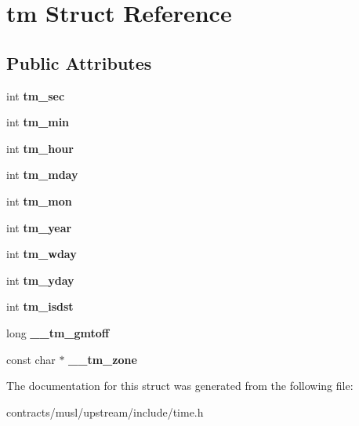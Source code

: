 \hypertarget{structtm}{}\section{tm Struct Reference}
\label{structtm}
\subsection*{Public Attributes}
\begin{DoxyCompactItemize}
\item 
\mbox{\label{structtm_a4d098a9a5c03a00b2ee61e10851de81e}} 
int {\bfseries tm\+\_\+sec}
\item 
\mbox{\label{structtm_af414eb7c86cc3099595211eee4d4211b}} 
int {\bfseries tm\+\_\+min}
\item 
\mbox{\label{structtm_a3e7ca4e37f1abcaf56b8a916c38eb9fe}} 
int {\bfseries tm\+\_\+hour}
\item 
\mbox{\label{structtm_ab8d8904bad43b0c8b96e61941c5b5310}} 
int {\bfseries tm\+\_\+mday}
\item 
\mbox{\label{structtm_a112ac36fa2f593777138a417cf031e17}} 
int {\bfseries tm\+\_\+mon}
\item 
\mbox{\label{structtm_a33adf78fd6476b2120ce3b9c4a852053}} 
int {\bfseries tm\+\_\+year}
\item 
\mbox{\label{structtm_afe81a8c46f1c693c43f259b288859f4f}} 
int {\bfseries tm\+\_\+wday}
\item 
\mbox{\label{structtm_a93a0ba77cc23796df84405dcbcc57eb1}} 
int {\bfseries tm\+\_\+yday}
\item 
\mbox{\label{structtm_a5645ca0580c8ab2c24f6c2965d9c9f9c}} 
int {\bfseries tm\+\_\+isdst}
\item 
\mbox{\label{structtm_ab077b3fcacf0aa575918483856c9cc7c}} 
long {\bfseries \+\_\+\+\_\+tm\+\_\+gmtoff}
\item 
\mbox{\label{structtm_ada643d899220f1284814158a9efaf0f0}} 
const char $\ast$ {\bfseries \+\_\+\+\_\+tm\+\_\+zone}
\end{DoxyCompactItemize}


The documentation for this struct was generated from the following file\+:\begin{DoxyCompactItemize}
\item 
contracts/musl/upstream/include/time.\+h\end{DoxyCompactItemize}
